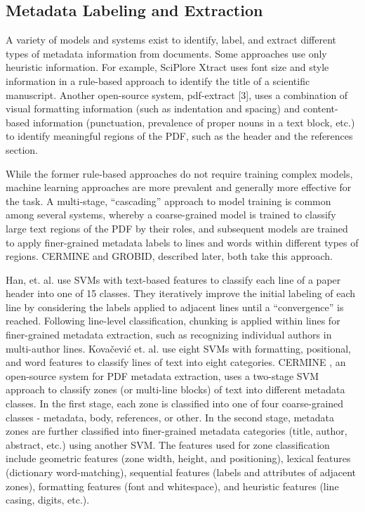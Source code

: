 \documentclass{acm_proc_article-sp}
\begin{document}
\subsection{Metadata Labeling and Extraction}
A variety of models and systems exist to identify, label, and extract different types of metadata information from documents. Some approaches use only heuristic information. For example, SciPlore Xtract \cite{beel2010sciplore} uses font size and style information in a rule-based approach to identify the title of a scientific manuscript. Another open-source system, pdf-extract [3], uses a combination of visual formatting information (such as indentation and spacing) and content-based information (punctuation, prevalence of proper nouns in a text block, etc.) to identify meaningful regions of the PDF, such as the header and the references section. 

While the former rule-based approaches do not require training complex models, machine learning approaches are more prevalent and generally more effective for the task. A multi-stage, “cascading” approach to model training is common among several systems, whereby a coarse-grained model is trained to classify large text regions of the PDF by their roles, and subsequent models are trained to apply finer-grained metadata labels to lines and words within different types of regions. CERMINE and GROBID, described later, both take this approach.

Han, et. al. \cite{han2003automatic} use SVMs with text-based features to classify each line of a paper header into one of 15 classes. They iteratively improve the initial labeling of each line by considering the labels applied to adjacent lines until a “convergence” is reached. Following line-level classification, chunking is applied within lines for finer-grained metadata extraction, such as recognizing individual authors in multi-author lines. Kovačević et. al. \cite{kovavcevic2011automatic} use eight SVMs with formatting, positional, and word features to classify lines of text into eight categories. CERMINE \cite{tkaczyk2015cermine}, an open-source system for PDF metadata extraction, uses a two-stage SVM approach to classify zones (or multi-line blocks) of text into different metadata classes. In the first stage, each zone is classified into one of four coarse-grained classes - metadata, body, references, or other. In the second stage, metadata zones are further classified into finer-grained metadata categories (title, author, abstract, etc.) using another SVM. The features used for zone classification include geometric features (zone width, height, and positioning), lexical features (dictionary word-matching), sequential features (labels and attributes of adjacent zones), formatting features (font and whitespace), and heuristic features (line casing, digits, etc.).
\end{document}
